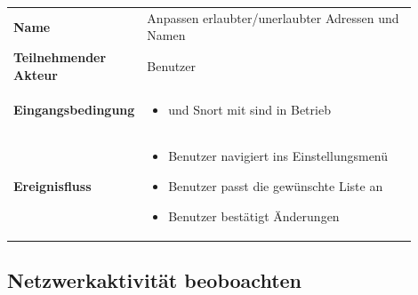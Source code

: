 \begin{tabular}{lp{0.9\linewidth}}

\textbf{Name} & Anpassen erlaubter/unerlaubter Adressen und Namen \\

\textbf{Teilnehmender Akteur} & Benutzer \\

\textbf{Eingangsbedingung} &
				\begin{minipage}[t]{\linewidth}
				\begin{itemize}[nosep,after=\strut,leftmargin=10pt]
				
				\item \programname und Snort mit \sppname sind in Betrieb

				\end{itemize}
				\end{minipage} \\
\textbf{Ereignisfluss} &
				\begin{minipage}[t]{\linewidth}
				\begin{itemize}[nosep,after=\strut,leftmargin=10pt]

				\item Benutzer navigiert ins Einstellungsmenü
				\item Benutzer passt die gewünschte Liste an
				\item Benutzer bestätigt Änderungen
				
				\end{itemize}
				\end{minipage} \\

\end{tabular}

\subsection{Netzwerkaktivität beoboachten}

